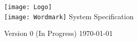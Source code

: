 \begin{titlepage}
  \begin{center}
    \texttt{[image: Logo]} \\
    \vfill
    \texttt{[image: Wordmark]}
    \vfill
    \vfill
    \LARGE
    System Specification
  \end{center}

  \vfill
  \vfill


  \vspace{1em}

  \large
  Version 0 (In Progress) \newline
  \today
  \normalsize
\end{titlepage}
\restoregeometry